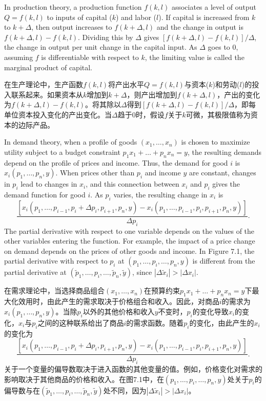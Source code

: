 \begin{original}
In production theory, a production function $f(k, l)$ associates a level of output $Q = f(k, l)$ to inputs of capital ($k$) and labor ($l$). If capital is increased from $k$ to $k + \Delta$, then output increases to $f(k + \Delta, l)$ and the change in output is $f(k + \Delta, l) - f(k, l)$. Dividing this by $\Delta$ gives $[f(k + \Delta, l) - f(k, l)]/\Delta$, the change in output per unit change in the capital input. As $\Delta$ goes to 0, assuming $f$ is differentiable with respect to $k$, the limiting value is called the marginal product of capital.
\end{original}
\begin{translation}
在生产理论中，生产函数$f(k, l)$将产出水平$Q = f(k, l)$与资本($k$)和劳动($l$)的投入联系起来。如果资本从$k$增加到$k + \Delta$，则产出增加到$f(k + \Delta, l)$，产出的变化为$f(k + \Delta, l) - f(k, l)$。将其除以$\Delta$得到$[f(k + \Delta, l) - f(k, l)]/\Delta$，即每单位资本投入变化的产出变化。当$\Delta$趋于0时，假设$f$关于$k$可微，其极限值称为资本的边际产品。
\end{translation}

\begin{original}
In demand theory, when a profile of goods $(x_1, \dots, x_n)$ is chosen to maximize utility subject to a budget constraint $p_1 x_1 + \dots + p_n x_n = y$, the resulting demands depend on the profile of prices and income. Thus, the demand for good $i$ is $x_i(p_1, \dots, p_n, y)$. When prices other than $p_i$ and income $y$ are constant, changes in $p_i$ lead to changes in $x_i$, and this connection between $x_i$ and $p_i$ gives the demand function for good $i$. As $p_i$ varies, the resulting change in $x_i$ is
\[
\frac{[x_i(p_1, \dots, p_{i-1}, p_i + \Delta p_i, p_{i+1}, p_n, y) - x_i(p_1, \dots, p_{i-1}, p_i, p_{i+1}, p_n, y)]}{\Delta p_i}.
\]
The partial derivative with respect to one variable depends on the values of the other variables entering the function. For example, the impact of a price change on demand depends on the prices of other goods and income. In Figure 7.1, the partial derivative with respect to $p_i$ at $(p_1, \dots, p_i, \dots, p_n, y)$ is different from the partial derivative at $(\tilde{p}_1, \dots, p_i, \dots, \tilde{p}_n, \tilde{y})$, since $|\Delta \tilde{x}_i| > |\Delta x_i|$.
\end{original}
\begin{translation}
在需求理论中，当选择商品组合$(x_1, \dots, x_n)$在预算约束$p_1 x_1 + \dots + p_n x_n = y$下最大化效用时，由此产生的需求取决于价格组合和收入。因此，对商品$i$的需求为$x_i(p_1, \dots, p_n, y)$。当除$p_i$以外的其他价格和收入$y$不变时，$p_i$的变化导致$x_i$的变化，$x_i$与$p_i$之间的这种联系给出了商品$i$的需求函数。随着$p_i$的变化，由此产生的$x_i$的变化为
\[
\frac{[x_i(p_1, \dots, p_{i-1}, p_i + \Delta p_i, p_{i+1}, p_n, y) - x_i(p_1, \dots, p_{i-1}, p_i, p_{i+1}, p_n, y)]}{\Delta p_i}.
\]
关于一个变量的偏导数取决于进入函数的其他变量的值。例如，价格变化对需求的影响取决于其他商品的价格和收入。在图7.1中，在$(p_1, \dots, p_i, \dots, p_n, y)$处关于$p_i$的偏导数与在$(\tilde{p}_1, \dots, p_i, \dots, \tilde{p}_n, \tilde{y})$处不同，因为$|\Delta \tilde{x}_i| > |\Delta x_i|$。
\end{translation}

